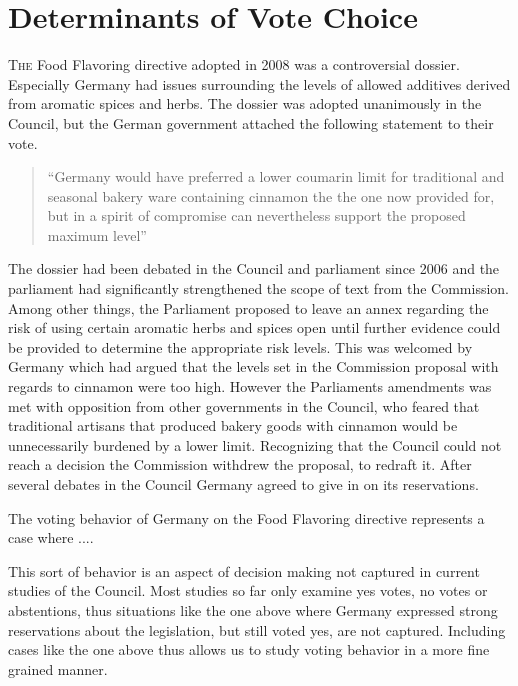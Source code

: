 
\chapter{Determinants of Vote Choice}

\lettrine{T}{he} Food Flavoring directive adopted in 2008 was a controversial dossier. Especially Germany had issues surrounding the levels of allowed additives derived from aromatic spices and herbs. The dossier was adopted unanimously in the Council, but the German government attached the following statement to their vote. 

\begin{quote}
  ``Germany would have preferred a lower coumarin limit for traditional and seasonal bakery ware containing cinnamon the the one now provided for, but in a spirit of compromise can nevertheless support the proposed maximum level''
\end{quote}

 The dossier had been debated in the Council and parliament since 2006 and the parliament had significantly strengthened the scope of text from the Commission. Among other things, the Parliament proposed to leave an annex regarding the risk of using certain aromatic herbs and spices open until further evidence could be provided to determine the appropriate risk levels. This was welcomed by Germany which had argued that the levels set in the Commission proposal with regards to cinnamon were too high. However the Parliaments amendments was met with opposition from other governments in the Council, who feared that traditional artisans that produced bakery goods with cinnamon would be unnecessarily burdened by a lower limit.  Recognizing that the Council could not reach a decision the Commission withdrew the proposal, to redraft it. After several debates in the Council Germany agreed to give in on its reservations. 

The voting behavior of Germany on the Food Flavoring directive represents a case where  ....

This sort of behavior is an aspect of decision making not captured in current studies of the Council.  Most studies so far only examine yes votes, no votes or abstentions, thus situations like the one above where Germany expressed strong reservations about the legislation, but still voted yes, are not captured. Including cases like the one above thus allows us to study voting behavior in a more fine grained manner.

